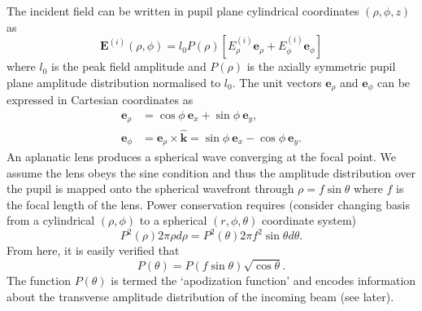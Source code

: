 \documentclass[12pt,a4paper]{article}
\begin{document}
The incident field can be written in pupil plane cylindrical coordinates \(\left(\rho,\phi,z\right)\) as
\begin{displaymath}
	\mathbf{E}^{(i)}\!\left(\rho,\phi\right) = l_{0}P\!\left(\rho\right)\left[E_{\rho}^{(i)}\mathbf{e}_{\rho} + E_{\phi}^{(i)}\mathbf{e}_{\phi}\right]
\end{displaymath}
where \(l_{0}\) is the peak field amplitude and \(P\!\left(\rho\right)\) is the axially symmetric pupil plane amplitude distribution normalised to \(l_{0}\). The unit vectors \(\mathbf{e}_{\rho}\) and \(\mathbf{e}_{\phi}\) can be expressed in Cartesian coordinates as
\begin{align}
		\mathbf{e}_{\rho} &= \cos{\phi}\:\mathbf{e}_{x} + \sin{\phi}\:\mathbf{e}_{y}, \nonumber \\
		\mathbf{e}_{\phi} &= \mathbf{e}_{\rho}\times\hat{\mathbf{k}} = \sin{\phi}\:\mathbf{e}_{x} - \cos{\phi}\:\mathbf{e}_{y}. \nonumber
\end{align}
An aplanatic lens produces a spherical wave converging at the focal point. We assume the lens obeys the sine condition and thus the amplitude distribution over the pupil is mapped onto the spherical wavefront through \(\rho=f\sin{\theta}\) where \(f\) is the focal length of the lens. Power conservation requires (consider changing basis from a cylindrical \(\left(\rho,\phi\right)\) to a spherical \(\left(r,\phi,\theta\right)\) coordinate system) 
\begin{displaymath}
	P^{2}\!\left(\rho\right)2\pi\rho d\rho = P^{2}\!\left(\theta\right)2\pi f^{2}\sin{\theta}d\theta .
\end{displaymath}
From here, it is easily verified that
\begin{displaymath}
	P\!\left(\theta\right) = P\!\left(f\sin{\theta}\right)\sqrt{\cos{\theta}} .
\end{displaymath}
The function \(P\!\left(\theta\right)\) is termed the `apodization function' and encodes information about the transverse amplitude distribution of the incoming beam (see later).
\end{document}
